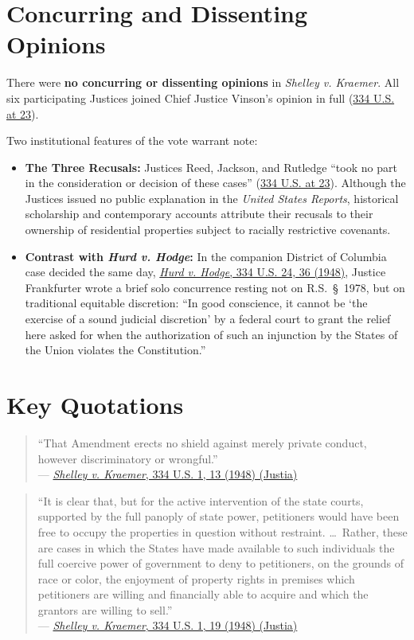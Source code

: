\documentclass[12pt]{article}
\begin{document}
\section{Concurring and Dissenting Opinions}

There were \textbf{no concurring or dissenting opinions} in \textit{Shelley v. Kraemer}. All six participating Justices joined Chief Justice Vinson's opinion in full (\href{https://supreme.justia.com/cases/federal/us/334/1/}{334 U.S. at 23}).

Two institutional features of the vote warrant note:
\begin{itemize}
    \item \textbf{The Three Recusals:} Justices Reed, Jackson, and Rutledge ``took no part in the consideration or decision of these cases'' (\href{https://supreme.justia.com/cases/federal/us/334/1/}{334 U.S. at 23}). Although the Justices issued no public explanation in the \textit{United States Reports}, historical scholarship and contemporary accounts attribute their recusals to their ownership of residential properties subject to racially restrictive covenants.
    \item \textbf{Contrast with \textit{Hurd v. Hodge}:} In the companion District of Columbia case decided the same day, \href{https://supreme.justia.com/cases/federal/us/334/24/}{\textit{Hurd v. Hodge}, 334 U.S. 24, 36 (1948)}, Justice Frankfurter wrote a brief solo concurrence resting not on R.S.~\S~1978, but on traditional equitable discretion: ``In good conscience, it cannot be `the exercise of a sound judicial discretion' by a federal court to grant the relief here asked for when the authorization of such an injunction by the States of the Union violates the Constitution.''
\end{itemize}

\section{Key Quotations}

\begin{quote}
``That Amendment erects no shield against merely private conduct, however discriminatory or wrongful.'' \\
--- \href{https://supreme.justia.com/cases/federal/us/334/1/}{\textit{Shelley v. Kraemer}, 334 U.S. 1, 13 (1948) (Justia)}
\end{quote}

\begin{quote}
``It is clear that, but for the active intervention of the state courts, supported by the full panoply of state power, petitioners would have been free to occupy the properties in question without restraint. \ldots\ Rather, these are cases in which the States have made available to such individuals the full coercive power of government to deny to petitioners, on the grounds of race or color, the enjoyment of property rights in premises which petitioners are willing and financially able to acquire and which the grantors are willing to sell.'' \\
--- \href{https://supreme.justia.com/cases/federal/us/334/1/}{\textit{Shelley v. Kraemer}, 334 U.S. 1, 19 (1948) (Justia)}
\end{quote}
\end{document}
